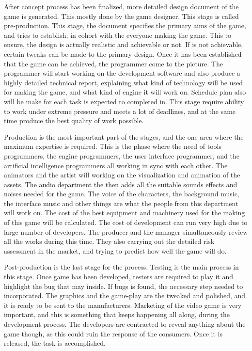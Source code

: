 \documentclass[12pt]{article}
\begin{document}
After concept process has been finalized, more detailed design document of the game is generated. This mostly done by the game designer. This stage is called pre-production. This stage, the document specifies the primary aims of the game, and tries to establish, in cohort with the everyone making the game. This to ensure, the design is actually realistic and achievable or not. If is not achievable, certain tweaks can be made to the primary design. Once it has been established that the game can be achieved, the programmer come to the picture. The programmer will start working on the development software and also produce a highly detailed technical report, explaining what kind of technology will be used for making the game, and what kind of engine it will work on. Schedule plan also will be make for each task is expected to completed in. This stage require ability to work under extreme pressure and meets a lot of deadlines, and at the same time produce the best quality of work possible.

\par

Production is the most important part of the stages, and the one area where the maximum expertise is required. This is the phase where the need of tools programmers, the engine programmers, the user interface programmer, and the artificial intelligence programmers all working in sync with each other. The animators and the artist will working on the visualization and animation of the assets. The audio department the then adds all the suitable sounds effects and noises needed for the game. The voice of the characters, the background music, the interface music and other things are what the people from this department will work on. The cost of the best equipment and machinery used for the making of this game will be calculated. The cost of development can run very high due to large number of developers. The producer and the manager simultaneously review all the works during this time. They also carrying out the detailed risk assessment in the market, and trying to predict how well the game will do.

\par

Post-production is the last stage for the process. Testing is the main process in this stage. Once game has been developed, testers are required to play it and highlight the bug that may inside. If bugs is found, the necessary step needed to incorporated. The graphics and the game-play are the tweaked and polished, and it is ready to be sent to the manufacturers. Marketing of the video game is very important, and this is something that keeps happening all along, during the development process. The developers are contracted to reveal anything about the game though, as this could ruin the response of the consumers. Once it is released, the task is accomplished.
\end{document}
